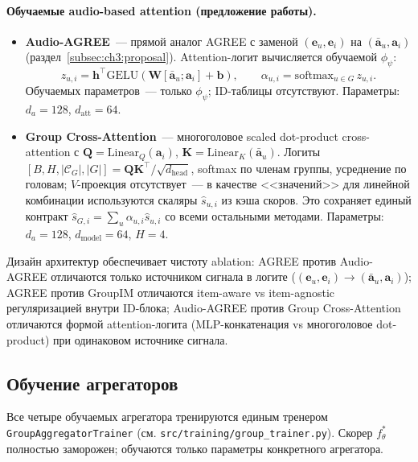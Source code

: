 \paragraph{Обучаемые audio-based attention (предложение работы).}
\begin{itemize}
    \item \textbf{Audio-AGREE}~--- прямой аналог AGREE с заменой $(\mathbf{e}_u, \mathbf{e}_i)$ на $(\bar{\mathbf{a}}_u, \mathbf{a}_i)$ (раздел~\ref{subsec:ch3:proposal}). Attention-логит вычисляется обучаемой $\phi_\psi$:
    \begin{equation*}
        z_{u, i} = \mathbf{h}^\top \mathrm{GELU}\!\left( \mathbf{W} [\bar{\mathbf{a}}_u; \mathbf{a}_i] + \mathbf{b} \right),
        \qquad \alpha_{u, i} = \mathrm{softmax}_{u \in G}\, z_{u, i}.
    \end{equation*}
    Обучаемых параметров~--- только $\phi_\psi$; ID-таблицы отсутствуют. Параметры: $d_a = 128$, $d_{\mathrm{att}} = 64$.
    \item \textbf{Group Cross-Attention}~--- многоголовое scaled dot-product cross-attention с $\mathbf{Q} = \mathrm{Linear}_Q(\mathbf{a}_i)$, $\mathbf{K} = \mathrm{Linear}_K(\bar{\mathbf{a}}_u)$. Логиты $[B, H, |\mathcal{C}_G|, |G|] = \mathbf{Q}\mathbf{K}^\top / \sqrt{d_{\mathrm{head}}}$, softmax по членам группы, усреднение по головам; $V$-проекция отсутствует~--- в качестве <<значений>> для линейной комбинации используются скаляры $\hat{s}_{u, i}$ из кэша скоров. Это сохраняет единый контракт $\hat{s}_{G, i} = \sum_u \alpha_{u, i} \hat{s}_{u, i}$ со всеми остальными методами. Параметры: $d_a = 128$, $d_{\mathrm{model}} = 64$, $H = 4$.
\end{itemize}

Дизайн архитектур обеспечивает чистоту ablation: AGREE против Audio-AGREE отличаются только источником сигнала в логите ($(\mathbf{e}_u, \mathbf{e}_i) \to (\bar{\mathbf{a}}_u, \mathbf{a}_i)$); AGREE против GroupIM отличаются item-aware vs item-agnostic регуляризацией внутри ID-блока; Audio-AGREE против Group Cross-Attention отличаются формой attention-логита (MLP-конкатенация vs многоголовое dot-product) при одинаковом источнике сигнала.

\subsection{Обучение агрегаторов}\label{subsec:ch3:group-train}

Все четыре обучаемых агрегатора тренируются единым тренером \texttt{GroupAggregatorTrainer} (см. \texttt{src/training/group\_trainer.py}). Скорер $f_\theta^\ast$ полностью заморожен; обучаются только параметры конкретного агрегатора.

